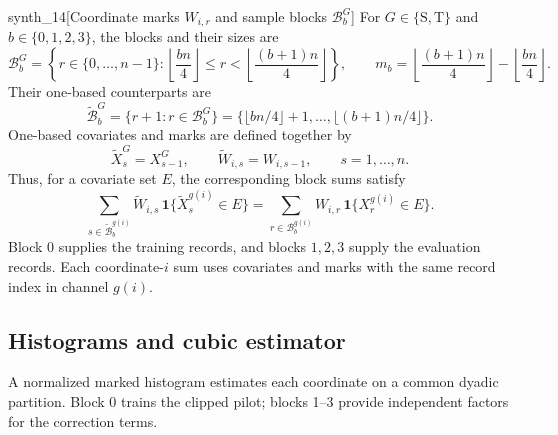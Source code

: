 \documentclass[11pt]{article}
\begin{document}
\begin{definitionv}{synth_14}[Coordinate marks \(W_{i,r}\) and sample blocks \(\mathcal B_b^G\)]
For \(G\in\{\mathrm S,\mathrm T\}\) and \(b\in\{0,1,2,3\}\), the blocks and their sizes are
\[
\mathcal B_b^G
=
\left\{
r\in\{0,\ldots,n-1\}:
\left\lfloor\frac{bn}{4}\right\rfloor
\le r<
\left\lfloor\frac{(b+1)n}{4}\right\rfloor
\right\},
\qquad
m_b=\left\lfloor\frac{(b+1)n}{4}\right\rfloor
-\left\lfloor\frac{bn}{4}\right\rfloor.
\]
Their one-based counterparts are
\[
\widetilde{\mathcal B}_b^G
=\{r+1:r\in\mathcal B_b^G\}
=\{\lfloor bn/4\rfloor+1,\ldots,\lfloor(b+1)n/4\rfloor\}.
\]
One-based covariates and marks are defined together by
\[
\widetilde X_s^G=X_{s-1}^G,
\qquad
\widetilde W_{i,s}=W_{i,s-1},
\qquad s=1,\ldots,n.
\]
Thus, for a covariate set \(E\), the corresponding block sums satisfy
\[
\sum_{s\in\widetilde{\mathcal B}_b^{g(i)}}
\widetilde W_{i,s}\,
\mathbf 1\{\widetilde X_s^{g(i)}\in E\}
=
\sum_{r\in\mathcal B_b^{g(i)}}
W_{i,r}\,\mathbf 1\{X_r^{g(i)}\in E\}.
\]
Block \(0\) supplies the training records, and blocks \(1,2,3\) supply the evaluation records. Each coordinate-\(i\) sum uses covariates and marks with the same record index in channel \(g(i)\).
\end{definitionv}

\subsection{Histograms and cubic estimator}

A normalized marked histogram estimates each coordinate on a common dyadic partition. Block 0 trains the clipped pilot; blocks 1--3 provide independent factors for the correction terms.
\end{document}
